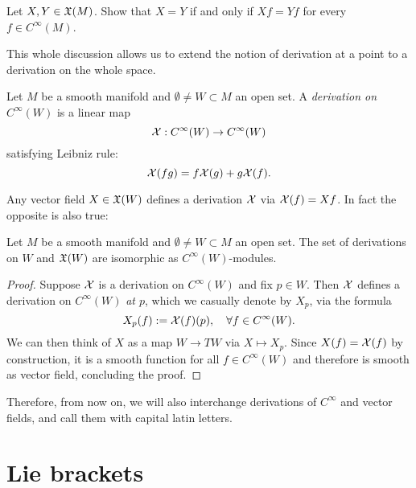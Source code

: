 \begin{exercise}
  Let $X,Y\in\mathfrak{X}(M)$.
  Show that $X=Y$ if and only if $Xf = Yf$ for every $f\in C^\infty(M)$.
\end{exercise}

This whole discussion allows us to extend the notion of derivation at a point to a derivation on the whole space.
\begin{definition}
  Let $M$ be a smooth manifold and $\emptyset\neq W\subset M$ an open set.
  A \emph{derivation on $C^\infty(W)$} is a linear map
  \begin{equation}
    \mathcal{X}:C^\infty(W)\to C^\infty(W)
  \end{equation}
  satisfying Leibniz rule:
  \begin{equation}
    \mathcal{X}(fg) = f \mathcal{X}(g) + g \mathcal{X}(f).
  \end{equation}
\end{definition}

Any vector field $X\in\mathfrak{X}(W)$ defines a derivation $\mathcal{X}$ via $\mathcal{X}(f) = Xf$. In fact the opposite is also true:
\begin{proposition}
  Let $M$ be a smooth manifold and $\emptyset\neq W\subset M$ an open set.
  The set of derivations on $W$ and $\mathfrak{X}(W)$ are isomorphic as $C^\infty(W)$-modules.
\end{proposition}
\begin{proof}
  Suppose $\mathcal{X}$ is a derivation on $C^\infty(W)$ and fix $p\in W$. Then $\mathcal{X}$ defines a derivation on $C^\infty(W)$ \emph{at $p$}, which we casually denote by $X_p$, via the formula
  \begin{equation}
    X_p(f) := \mathcal{X}(f)(p), \quad\forall f\in C^\infty(W).
  \end{equation}
  We can then think of $X$ as a map $W\to TW$ via $X\mapsto X_p$.
  Since $X(f)=\mathcal{X}(f)$ by construction, it is a smooth function for all $f\in C^\infty(W)$ and therefore is smooth as vector field, concluding the proof.
\end{proof}

Therefore, from now on, we will also interchange derivations of $C^\infty$ and vector fields, and call them with capital latin letters.

\section{Lie brackets}

